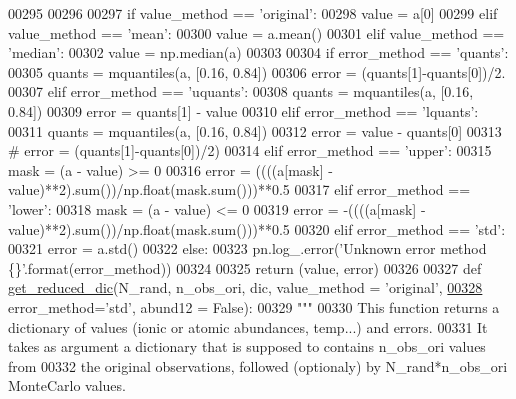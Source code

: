 \begin{DoxyCode}
{{{{{00295     
00296     
00297     \textcolor{keywordflow}{if} value\_method == \textcolor{stringliteral}{'original'}:
00298         value = a[0]
00299     \textcolor{keywordflow}{elif} value\_method == \textcolor{stringliteral}{'mean'}:
00300         value = a.mean()
00301     \textcolor{keywordflow}{elif} value\_method == \textcolor{stringliteral}{'median'}:
00302         value = np.median(a)
00303     
00304     \textcolor{keywordflow}{if} error\_method == \textcolor{stringliteral}{'quants'}:
00305         quants = mquantiles(a, [0.16, 0.84])
00306         error = (quants[1]-quants[0])/2.
00307     \textcolor{keywordflow}{elif} error\_method == \textcolor{stringliteral}{'uquants'}:
00308         quants = mquantiles(a, [0.16, 0.84])
00309         error = quants[1] - value
00310     \textcolor{keywordflow}{elif} error\_method == \textcolor{stringliteral}{'lquants'}:
00311         quants = mquantiles(a, [0.16, 0.84])
00312         error = value - quants[0]
00313         \textcolor{comment}{# error = (quants[1]-quants[0])/2)}
00314     \textcolor{keywordflow}{elif} error\_method == \textcolor{stringliteral}{'upper'}:
00315         mask = (a - value) >= 0
00316         error =  ((((a[mask] - value)**2).sum())/np.float(mask.sum()))**0.5
00317     \textcolor{keywordflow}{elif} error\_method == \textcolor{stringliteral}{'lower'}:
00318         mask = (a - value) <= 0
00319         error = -((((a[mask] - value)**2).sum())/np.float(mask.sum()))**0.5
00320     \textcolor{keywordflow}{elif} error\_method == \textcolor{stringliteral}{'std'}:
00321         error = a.std()
00322     \textcolor{keywordflow}{else}:
00323         pn.log\_.error(\textcolor{stringliteral}{'Unknown error method \{\}'}.format(error\_method))
00324         
00325     \textcolor{keywordflow}{return} (value, error)
00326     
00327 \textcolor{keyword}{def }\hyperlink{namespacepyneb_1_1utils_1_1misc_ad6fc4e32ea4c076ac81e99b5c1e74f13}{get\_reduced\_dic}(N\_rand, n\_obs\_ori, dic, value\_method = 'original', 
\hypertarget{misc_8py_source_l00328}{}\hyperlink{namespacepyneb_1_1utils_1_1misc_ad6fc4e32ea4c076ac81e99b5c1e74f13}{00328}                     error\_method=\textcolor{stringliteral}{'std'}, abund12 = \textcolor{keyword}{False}):
00329     \textcolor{stringliteral}{"""}
00330 \textcolor{stringliteral}{    This function returns a dictionary of values (ionic or atomic abundances, temp...) and errors.}
00331 \textcolor{stringliteral}{    It takes as argument a dictionary that is supposed to contains n\_obs\_ori values from}
00332 \textcolor{stringliteral}{        the original observations, followed (optionaly) by N\_rand*n\_obs\_ori MonteCarlo values.}
}}}}}
\end{DoxyCode}
